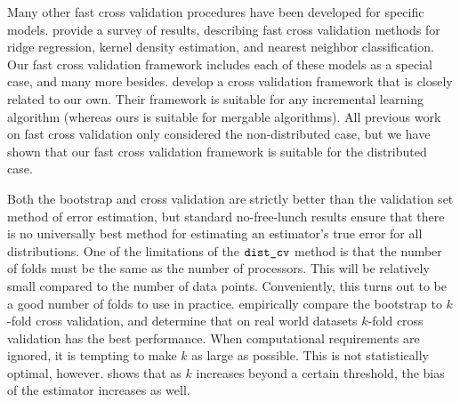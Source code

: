 \documentclass[thesis.tex]{subfiles}
\newcommand{\set}[1]{\mathcal {#1}}
\newcommand{\mappend}[1]{\oplus_{\set {#1}}}
\newcommand{\distcv}{\mkprocedure{dist\_cv}}
\begin{document}
Many other fast cross validation procedures have been developed for specific models.
\citet{arlot2010survey} provide a survey of results,
describing fast cross validation methods for ridge regression, kernel density estimation, and nearest neighbor classification.
Our fast cross validation framework includes each of these models as a special case,
and many more besides.
\citet{joulani2015fast} develop a cross validation framework that is closely related to our own.
Their framework is suitable for any incremental learning algorithm 
(whereas ours is suitable for mergable algorithms).
All previous work on fast cross validation only considered the non-distributed case,
but we have shown that our fast cross validation framework is suitable for the distributed case.

Both the bootstrap and cross validation are strictly better than the validation set method of error estimation,
but 
standard no-free-lunch results \citep[e.g.\ Chapter 8 of][]{shalev2014understanding} ensure that there is no universally best method for estimating an estimator's true error for all distributions.
One of the limitations of the $\distcv$ method is that the number of folds must be the same as the number of processors.
This will be relatively small compared to the number of data points.
Conveniently, this turns out to be a good number of folds to use in practice.
\citet{kohavi1995study} empirically compare the bootstrap to $k$-fold cross validation,
and determine that on real world datasets $k$-fold cross validation has the best performance.
When computational requirements are ignored,
it is tempting to make $k$ as large as possible.
This is not statistically optimal, however.
\citet{rao2008dangers} shows that as $k$ increases beyond a certain threshold, 
the bias of the estimator increases as well.


%
\end{document}
